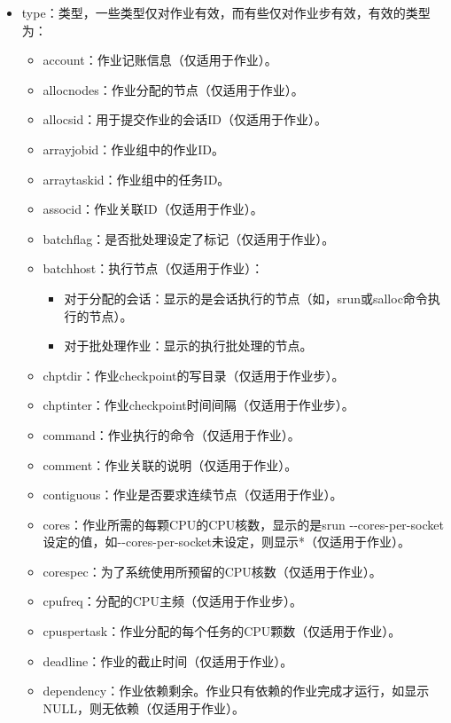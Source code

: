\begin{itemize}
\begin{itemize}
	\item type：类型，一些类型仅对作业有效，而有些仅对作业步有效，有效的类型为：
\begin{itemize}
	\item account：作业记账信息（仅适用于作业）。
    \item allocnodes：作业分配的节点（仅适用于作业）。
    \item allocsid：用于提交作业的会话ID（仅适用于作业）。
    \item arrayjobid：作业组中的作业ID。
    \item arraytaskid：作业组中的任务ID。
    \item associd：作业关联ID（仅适用于作业）。
    \item batchflag：是否批处理设定了标记（仅适用于作业）。
    \item batchhost：执行节点（仅适用于作业）：
\begin{itemize}
	\item 对于分配的会话：显示的是会话执行的节点（如，srun或salloc命令执行的节点）。
	\item 对于批处理作业：显示的执行批处理的节点。
\end{itemize}
    \item chptdir：作业checkpoint的写目录（仅适用于作业步）。
    \item chptinter：作业checkpoint时间间隔（仅适用于作业步）。
    \item command：作业执行的命令（仅适用于作业）。
    \item comment：作业关联的说明（仅适用于作业）。
    \item contiguous：作业是否要求连续节点（仅适用于作业）。
    \item cores：作业所需的每颗CPU的CPU核数，显示的是srun -{}-cores-per-socket设定的值，如-{}-cores-per-socket未设定，则显示*（仅适用于作业）。
    \item corespec：为了系统使用所预留的CPU核数（仅适用于作业）。
    \item cpufreq：分配的CPU主频（仅适用于作业步）。
    \item cpuspertask：作业分配的每个任务的CPU颗数（仅适用于作业）。
    \item deadline：作业的截止时间（仅适用于作业）。
    \item dependency：作业依赖剩余。作业只有依赖的作业完成才运行，如显示NULL，则无依赖（仅适用于作业）。

\end{itemize}
\end{itemize}
\end{itemize}
